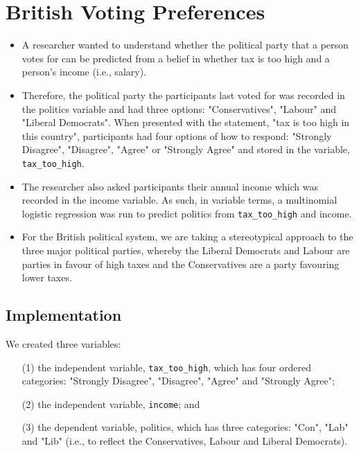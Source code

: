 \documentclass[a4paper,12pt]{article}
\begin{document}
\section*{British Voting Preferences}
\begin{itemize}
	\item A researcher wanted to understand whether the political party that a person votes for can be predicted from a belief in whether tax is too high and a person's income (i.e., salary). 
	\item Therefore, the political party the participants last voted for was recorded in the politics variable and had three options: "Conservatives", "Labour" and "Liberal Democrats". When presented with the statement, "tax is too high in this country", participants had four options of how to respond: "Strongly Disagree", "Disagree", "Agree" or "Strongly Agree" and stored in the variable, \texttt{tax\_too\_high}. 
	\item The researcher also asked participants their annual income which was recorded in the income variable. As such, in variable terms, a multinomial logistic regression was run to predict politics from \texttt{tax\_too\_high} and income.
	\item 
	For the British political system, we are taking a stereotypical approach to the three major political parties, whereby the Liberal Democrats and Labour are parties in favour of high taxes and the Conservatives are a party favouring lower taxes.
	
\end{itemize}


\subsection*{Implementation} 
We created three variables:
\begin{itemize} 
\item[(1)] the independent variable, \texttt{tax\_too\_high}, which has four ordered categories: "Strongly Disagree", "Disagree", "Agree" and "Strongly Agree"; 
\item[(2)] the independent variable, \texttt{income}; and 
\item[(3)] the dependent variable, politics, which has three categories: "Con", "Lab" and "Lib" (i.e., to reflect the Conservatives, Labour and Liberal Democrats).
\end{itemize}
\end{document}
